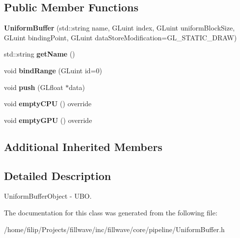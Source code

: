 \subsection*{Public Member Functions}
\begin{DoxyCompactItemize}
\item 
{\bfseries Uniform\+Buffer} (std\+::string name, G\+Luint index, G\+Luint uniform\+Block\+Size, G\+Luint binding\+Point, G\+Luint data\+Store\+Modification=G\+L\+\_\+\+S\+T\+A\+T\+I\+C\+\_\+\+D\+R\+AW)\hypertarget{classflw_1_1flc_1_1UniformBuffer_a8827d977ec5627f4e45c547e5503f6a4}{}\label{classflw_1_1flc_1_1UniformBuffer_a8827d977ec5627f4e45c547e5503f6a4}

\item 
std\+::string {\bfseries get\+Name} ()\hypertarget{classflw_1_1flc_1_1UniformBuffer_a1b2f21d79ebd22f4179edea021638c37}{}\label{classflw_1_1flc_1_1UniformBuffer_a1b2f21d79ebd22f4179edea021638c37}

\item 
void {\bfseries bind\+Range} (G\+Luint id=0)\hypertarget{classflw_1_1flc_1_1UniformBuffer_a54cf75c1395c83d2a2aa8ab77aba2fbc}{}\label{classflw_1_1flc_1_1UniformBuffer_a54cf75c1395c83d2a2aa8ab77aba2fbc}

\item 
void {\bfseries push} (G\+Lfloat $\ast$data)\hypertarget{classflw_1_1flc_1_1UniformBuffer_a343329c21e2a69521a76ffa025cae19f}{}\label{classflw_1_1flc_1_1UniformBuffer_a343329c21e2a69521a76ffa025cae19f}

\item 
void {\bfseries empty\+C\+PU} () override\hypertarget{classflw_1_1flc_1_1UniformBuffer_a26443bd469d8c144355f5f8fd388ac5d}{}\label{classflw_1_1flc_1_1UniformBuffer_a26443bd469d8c144355f5f8fd388ac5d}

\item 
void {\bfseries empty\+G\+PU} () override\hypertarget{classflw_1_1flc_1_1UniformBuffer_a8b4855883142bdab8924217d8f3938a0}{}\label{classflw_1_1flc_1_1UniformBuffer_a8b4855883142bdab8924217d8f3938a0}

\end{DoxyCompactItemize}
\subsection*{Additional Inherited Members}


\subsection{Detailed Description}
Uniform\+Buffer\+Object -\/ U\+BO. 

The documentation for this class was generated from the following file\+:\begin{DoxyCompactItemize}
\item 
/home/filip/\+Projects/fillwave/inc/fillwave/core/pipeline/Uniform\+Buffer.\+h\end{DoxyCompactItemize}
